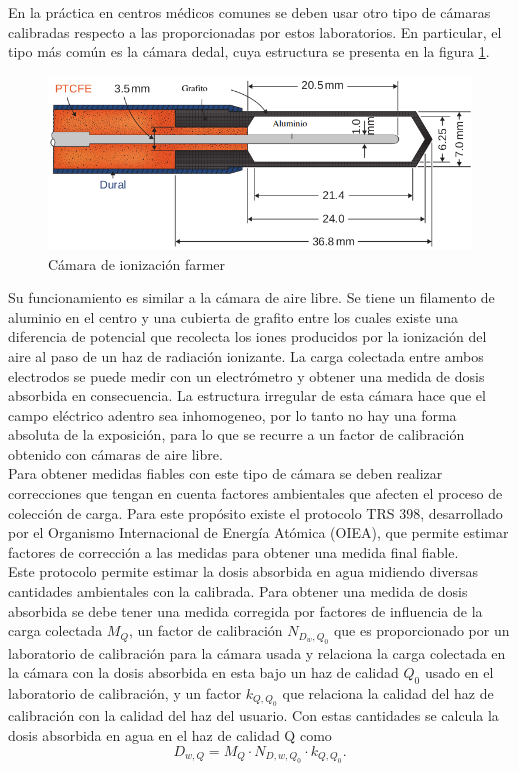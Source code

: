 En la práctica en centros médicos comunes se deben usar otro tipo de cámaras calibradas respecto a las proporcionadas por estos laboratorios. En particular, el tipo más común es la cámara dedal, cuya estructura se presenta en la figura \ref{fig:farmer}.\\

\begin{figure}[H]
	\centering
	\includegraphics[width=0.7\linewidth]{images/camaraIoni.png}
	\caption{Cámara de ionización farmer\cite{khan2014the}}
	\label{fig:farmer}
\end{figure}

Su funcionamiento es similar a la cámara de aire libre. Se tiene un filamento de aluminio en el centro y una cubierta de grafito entre los cuales existe una diferencia de potencial que recolecta los iones producidos por la ionización del aire al paso de un haz de radiación ionizante. La carga colectada entre ambos electrodos se puede medir con un electrómetro y obtener una medida de dosis absorbida en consecuencia. La estructura irregular de esta  cámara hace que el campo eléctrico adentro sea inhomogeneo, por lo tanto no hay una forma absoluta de la exposición, para lo que se recurre a un factor de calibración obtenido con cámaras de aire libre.\\

Para obtener medidas fiables con este tipo de cámara se deben realizar correcciones que tengan en cuenta factores ambientales que afecten el proceso de colección de carga. Para este propósito existe el protocolo TRS 398, desarrollado por el Organismo Internacional de Energía Atómica (OIEA), que permite estimar factores de corrección a las medidas para obtener una medida final fiable.\\

Este protocolo permite estimar la dosis absorbida en agua midiendo diversas cantidades ambientales con la calibrada. Para obtener una medida de dosis absorbida se debe tener una medida corregida por factores de influencia de la carga colectada $M_{Q}$, un factor de calibración $N_{D_{w},Q_{0}}$ que es proporcionado por un laboratorio de calibración para la cámara usada y relaciona la carga colectada en la cámara con la dosis absorbida en esta bajo un haz de calidad $Q_0$ usado en el laboratorio de calibración, y un factor $k_{Q,Q_{0}}$ que relaciona la calidad del haz de calibración con la calidad del haz del usuario. Con estas cantidades se calcula la dosis absorbida en agua en el haz de calidad Q como
\begin{equation}
D_{w,Q}=M_{Q}\cdot N_{D,w,Q_{0}}\cdot k_{Q,Q_{0}}.
\end{equation}

